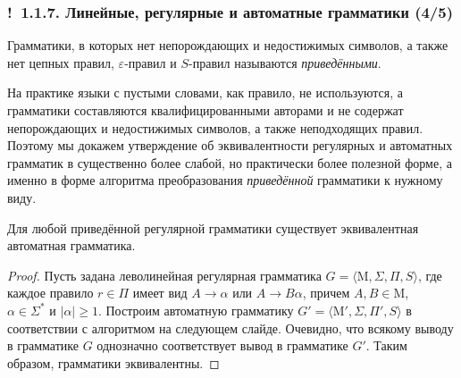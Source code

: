 \documentclass[mathserif,12pt,aspectratio=169]{beamer}
\def\emразделенной{\em разделенной}
\renewcommand{\index}[1]{}
\def\em#1{\it\color{blue}#1}
\def\odmkey#1#2{{\it\color{red} #1}\index{#2}}
\let\geq\geqslant
\def\Ok{{\color{green}\textbf{!}\ }}
\begin{document}
\begin{frame}
\frametitle{\Ok 1.1.7. Линейные, регулярные и автоматные грамматики (4/5)}
Грамматики, в которых нет непорождающих 
и недостижимых символов, а также нет 
цепных правил, 
$\varepsilon$-правил и
$S$-правил называются \odmkey{приведёнными}{Грамматика!приведённая}.

\smallskip
На практике языки с пустыми словами, как правило, не используются,
а грамматики составляются квалифицированными авторами и
не содержат непорождающих 
и недостижимых символов, а также неподходящих правил.
Поэтому мы докажем утверждение 
об эквивалентности регулярных и автоматных грамматик
в существенно более
слабой, но практически более полезной форме, а именно в форме
алгоритма преобразования {\em приведённой}  грамматики к нужному виду.

\begin{theorem}
Для любой приведённой регулярной грамматики существует эквивалентная автоматная
грамматика.
\end{theorem}

\begin{proof}
Пусть задана леволинейная регулярная грамматика $G=\langle \mathrm{M}, \Sigma,
\Pi, S\rangle$, где каждое правило $r\in \Pi$ имеет вид $A\rightarrow
\alpha$ или $A\rightarrow B\alpha$, причем $A, B \in \mathrm{M}$,\\
$\alpha\in \Sigma^*$ и $|\alpha|\geq 1$. Построим автоматную грамматику
$G'=\langle \mathrm{M}', \Sigma, \Pi', S\rangle$  в соответствии с алгоритмом на следующем слайде.
 Очевидно, что всякому выводу в грамматике $G$ однозначно
 соответствует вывод в грамматике $G'$. Таким образом, грамматики
 эквивалентны.
\end{proof}
\end{frame}
\end{document}
